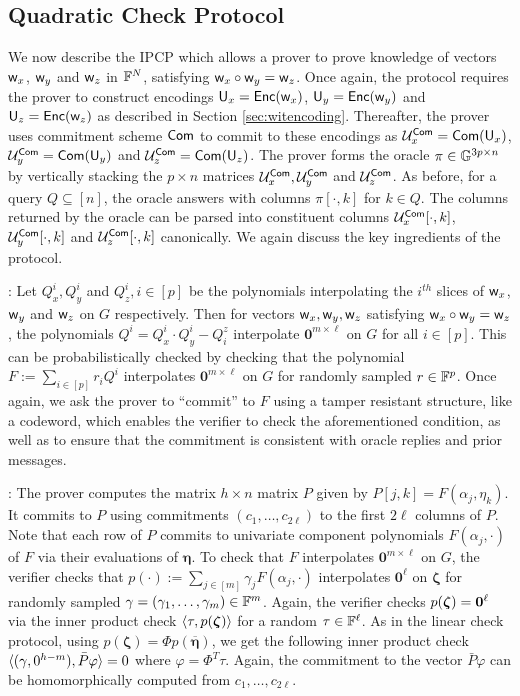 \subsection{Quadratic Check Protocol}
We now describe the IPCP which allows a prover to prove knowledge of vectors
$\mathsf{w}_x$, $\mathsf{w}_y$ and $\mathsf{w}_z$ in $\mathbb{F}^N$, satisfying $\mathsf{w}_x\circ \mathsf{w}_y =
\mathsf{w}_z$. Once again, the protocol requires the prover to construct encodings
$\mathsf{U}_x=\mathsf{Enc}(\mathsf{w}_x)$, $\mathsf{U}_y=\mathsf{Enc}(\mathsf{w}_y)$ and $\mathsf{U}_z=\mathsf{Enc}(\mathsf{w}_z)$ as
described in Section \ref{sec:witencoding}. Thereafter, the prover uses
commitment scheme $\mathsf{Com}$ to commit to these encodings as $\mathcal{U}^{\mathsf{Com}}_x =
\mathsf{Com}(\mathsf{U}_x)$, $\mathcal{U}^{\mathsf{Com}}_y = \mathsf{Com}(\mathsf{U}_y)$ and $\mathcal{U}^{\mathsf{Com}}_z = \mathsf{Com}(\mathsf{U}_z)$. 
The prover forms the oracle $\pi\in \mathbb{G}^{3p\times n}$ by vertically stacking the
$p\times n$ matrices $\mathcal{U}^{\mathsf{Com}}_x,\mathcal{U}^{\mathsf{Com}}_y$ and $\mathcal{U}^{\mathsf{Com}}_z$. As before,
for a query $Q\subseteq [n]$, the oracle answers with columns $\pi[\cdot,k]$ for
$k\in Q$. The columns returned by the oracle can be parsed into constituent columns 
$\mathcal{U}^{\mathsf{Com}}_x[\cdot,k]$, $\mathcal{U}^{\mathsf{Com}}_y[\cdot,k]$ and $\mathcal{U}^{\mathsf{Com}}_z[\cdot,k]$
canonically. We again discuss the key ingredients of the protocol.\smallskip

: Let $Q^i_x,Q^i_y$ and $Q^i_z, i\in [p]$ be the
polynomials interpolating the $i^{th}$ slices of $\mathsf{w}_x$, $\mathsf{w}_y$ and $\mathsf{w}_z$
 on $G$ respectively. Then for vectors $\mathsf{w}_x,\mathsf{w}_y,\mathsf{w}_z$ satisfying
$\mathsf{w}_x\circ \mathsf{w}_y=\mathsf{w}_z$, the polynomials $Q^i=Q^i_x\cdot Q^i_y - Q^z_i$ interpolate
$\bm{0}^{m\times \ell}$ on $G$ for all $i\in [p]$. This can be probabilistically
checked by checking that the polynomial $F := \sum_{i\in [p]}r_iQ^i$ interpolates
$\bm{0}^{m\times \ell}$ on $G$ for randomly sampled $r\in \mathbb{F}^p$. Once again, we
ask the prover to ``commit'' to $F$ using a tamper resistant structure, like a codeword,
which enables the verifier to check the aforementioned condition, as well as to
ensure that the commitment is consistent with oracle replies and prior
messages.\smallskip

: The prover computes the matrix
$h\times n$ matrix $P$ given by $P[j,k]=F(\alpha_j,\eta_k)$. It commits to $P$
using commitments $(c_1,\ldots,c_{2\ell})$ to the first $2\ell$ columns of $P$.
Note that each row of $P$ commits to univariate component polynomials
$F(\alpha_j,\cdot)$ of $F$ via their evaluations of $\bm{\eta}$. To check that
$F$ interpolates $\bm{0}^{m\times \ell}$ on $G$, the verifier checks that
$p(\cdot) := \sum_{j\in [m]}\gamma_jF(\alpha_j,\cdot)$ interpolates $\bm{0}^{\ell}$ on
$\bm{\zeta}$ for randomly sampled $\gamma=(\gamma_1,\ldots,\gamma_m)\in \mathbb{F}^m$.
Again, the verifier checks $p(\bm{\zeta})=\bf{0}^{\ell}$ via the inner product
check $\langle \tau,p(\bm{\zeta})\rangle$ for a random $\tau\in \mathbb{F}^{\ell}$. As in the
linear check protocol, using $p(\bm{\zeta})=\Phi p(\overline{\bm{\eta}})$, we
get the following inner product check
$\langle (\gamma,0^{h-m}),\bar{P}\varphi\rangle=0$ where $\varphi=\Phi^T\tau$. Again,
the commitment to the vector $\bar{P}\varphi$ can be homomorphically computed
from $c_1,\ldots,c_{2\ell}$. \smallskip

